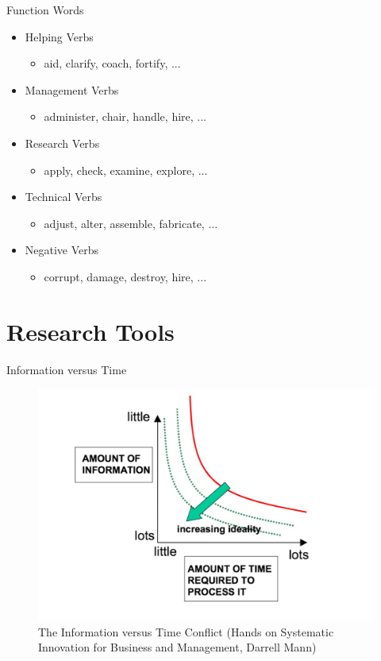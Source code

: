 \documentclass{beamer}
\begin{document}
	\begin{frame}{Function Words}
	\begin{itemize}
		 \item Helping Verbs
			     \begin{itemize}
					\item aid, clarify, coach, fortify, ...
				 \end{itemize} 
		 \item Management Verbs
			     \begin{itemize}
					\item administer, chair, handle, hire, ...
				 \end{itemize} 
		 \item Research Verbs
			     \begin{itemize}
					\item apply, check, examine, explore, ...
				 \end{itemize} 
		 \item Technical Verbs
			     \begin{itemize}
					\item adjust, alter, assemble, fabricate, ...
				 \end{itemize} 
		\item Negative Verbs
			     \begin{itemize}
					\item corrupt, damage, destroy, hire, ...
				 \end{itemize} 
	    \end{itemize}
	\end{frame}
	
	\section{Research Tools}
	 \begin{frame}{Information versus Time}
	        \begin{figure}
				\centering
				\includegraphics[scale=0.4]{graph_1.jpg}
				\caption{The Information versus Time Conflict (Hands on Systematic Innovation for Business and Management, Darrell Mann)}
			\end{figure}
	    \end{frame}
\end{document}

